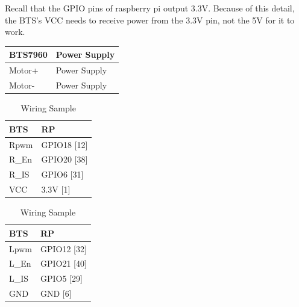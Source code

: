 \documentclass[a4paper, 10pt]{article}
\begin{document}
    Recall that the GPIO pins of raspberry pi output 3.3V. Because of this detail, the BTS's VCC needs to receive power from the 3.3V pin, not the 5V for it to work.

        \begin{table}[h]
        \centering
        \begin{tabular}{|l|l|}
        \hline
        \textbf{BTS7960} & \textbf{Power Supply} \\
        \hline
        Motor+ & Power Supply \\
        \hline
        Motor- & Power Supply \\
        \hline
        \end{tabular}
        \label{tab:motor}
        \end{table}
        
        \begin{table}[h]
        \centering
        \begin{minipage}{.35\linewidth}
        \centering
        \begin{tabular}{|l|l|}
        \hline
        \textbf{BTS} & \textbf{RP} \\
        \hline
        Rpwm & GPIO18 [12] \\
        \hline
        R\_En & GPIO20 [38] \\
        \hline
        R\_IS & GPIO6 [31] \\
        \hline
        VCC & 3.3V [1] \\
        \hline
        \end{tabular}
        \label{tab:right}
        \end{minipage}
        \begin{minipage}{.3\linewidth}
        \centering
        \begin{tabular}{|l|l|}
        \hline
        \textbf{BTS} & \textbf{RP} \\
        \hline
        Lpwm & GPIO12 [32] \\
        \hline
        L\_En & GPIO21 [40] \\
        \hline
        L\_IS & GPIO5 [29] \\
        \hline
        GND & GND [6] \\
        \hline
        \end{tabular}
        \label{tab:left}
        \end{minipage}
        \caption{Wiring Sample}
        \label{tab:pwm}
        \end{table}
        
\end{document}
